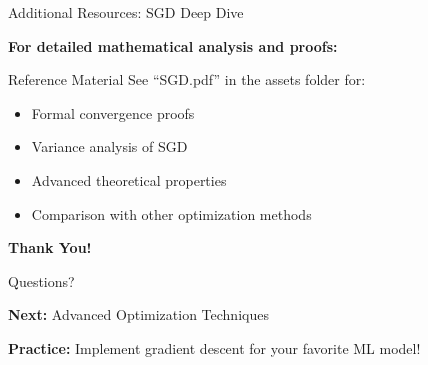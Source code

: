 \documentclass[usenames,dvipsnames]{beamer}
\begin{document}
  \begin{frame}{Additional Resources: SGD Deep Dive}
    \begin{center}
    \textbf{For detailed mathematical analysis and proofs:}
    \end{center}
    
    \begin{alertbox}{Reference Material}
    See ``SGD.pdf'' in the assets folder for:
    \begin{itemize}
        \item Formal convergence proofs
        \item Variance analysis of SGD
        \item Advanced theoretical properties
        \item Comparison with other optimization methods
    \end{itemize}
    \end{alertbox}
    
  \end{frame}

  \begin{frame}
    \centering
    \Huge \textbf{Thank You!}
    
    \vspace{1cm}
    \Large Questions?
    
    \vspace{1cm}
    \normalsize
    \textbf{Next:} Advanced Optimization Techniques
    
    \textbf{Practice:} Implement gradient descent for your favorite ML model!
  \end{frame}
\end{document}
